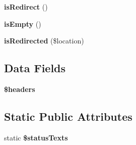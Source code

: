\begin{DoxyCompactItemize}
\item 
\hypertarget{class_symfony_1_1_component_1_1_http_foundation_1_1_response_ad698db94bdfd49c67d2a3ed2d0999908}{
{\bfseries is\-Redirect} ()}
\label{class_symfony_1_1_component_1_1_http_foundation_1_1_response_ad698db94bdfd49c67d2a3ed2d0999908}

\item 
\hypertarget{class_symfony_1_1_component_1_1_http_foundation_1_1_response_aedcc52b3673b8df9425e52f13accb2a1}{
{\bfseries is\-Empty} ()}
\label{class_symfony_1_1_component_1_1_http_foundation_1_1_response_aedcc52b3673b8df9425e52f13accb2a1}

\item 
\hypertarget{class_symfony_1_1_component_1_1_http_foundation_1_1_response_ae1570f22a234d66bc2f9a3edcfd8fbba}{
{\bfseries is\-Redirected} (\$location)}
\label{class_symfony_1_1_component_1_1_http_foundation_1_1_response_ae1570f22a234d66bc2f9a3edcfd8fbba}

\end{DoxyCompactItemize}
\subsection*{\-Data \-Fields}
\begin{DoxyCompactItemize}
\item 
\hypertarget{class_symfony_1_1_component_1_1_http_foundation_1_1_response_a52500036ee807241b8b4b7e2367c49ef}{
{\bfseries \$headers}}
\label{class_symfony_1_1_component_1_1_http_foundation_1_1_response_a52500036ee807241b8b4b7e2367c49ef}

\end{DoxyCompactItemize}
\subsection*{\-Static \-Public \-Attributes}
\begin{DoxyCompactItemize}
\item 
\hypertarget{class_symfony_1_1_component_1_1_http_foundation_1_1_response_ada173a2da067c98bfb9a49e51ebf1df3}{
static {\bfseries \$status\-Texts}}
\label{class_symfony_1_1_component_1_1_http_foundation_1_1_response_ada173a2da067c98bfb9a49e51ebf1df3}

\end{DoxyCompactItemize}
